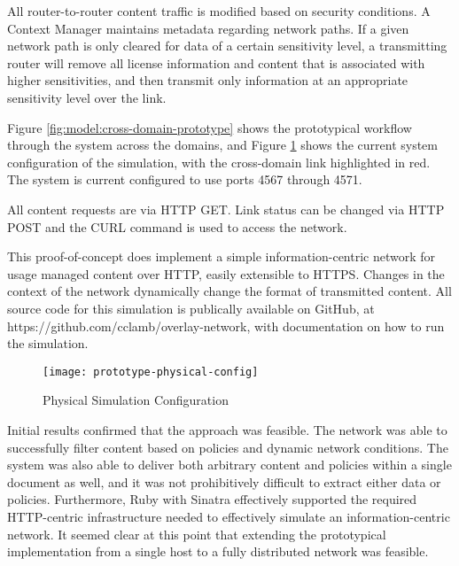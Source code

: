 All router-to-router content traffic is modified based on security conditions.  A Context Manager maintains metadata regarding network paths.  If a given network path is only cleared for data of a certain sensitivity level, a transmitting router will remove all license information and content that is associated with higher sensitivities, and then transmit only information at an appropriate sensitivity level over the link.

Figure \ref{fig:model:cross-domain-prototype} shows the prototypical workflow through the system across the domains, and Figure \ref{fig:model:prototype-physical-config} shows the current system configuration of the simulation, with the cross-domain link highlighted in red.  The system is current configured to use ports 4567 through 4571.

All content requests are via HTTP GET.  Link status can be changed via HTTP POST and the CURL command is used to access the network.

This proof-of-concept does implement a simple information-centric network for usage managed content over HTTP, easily extensible to HTTPS.  Changes in the context of the network dynamically change the format of transmitted content.  All source code for this simulation is publically available on GitHub, at https://github.com/cclamb/overlay-network, with documentation on how to run the simulation.

\begin{figure}[!t]
\centering
\texttt{[image: prototype-physical-config]}
\caption{Physical Simulation Configuration}
\label{fig:model:prototype-physical-config}
\end{figure}

Initial results confirmed that the approach was feasible.  The network was able to successfully filter content based on policies and dynamic network conditions.  The system was also able to deliver both arbitrary content and policies within a single document as well, and it was not prohibitively difficult to extract either data or policies.  Furthermore, Ruby with Sinatra effectively supported the required HTTP-centric infrastructure needed to effectively simulate an information-centric network.  It seemed clear at this point that extending the prototypical implementation from a single host to a fully distributed network was feasible.

